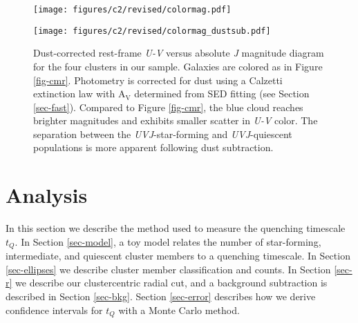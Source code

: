 \begin{figure*}[h!]
\centering \texttt{[image: figures/c2/revised/colormag.pdf]}
\caption[Color-magnitude diagram for the high-redshift SpARCS cluster sample]{Rest-frame \textit{U}-\textit{V} versus absolute \textit{J} magnitude diagram for all photometric-redshift-selected cluster members of the four clusters in the sample (see Table \ref{tbl-clusters}).
The inset panels show rest-frame \textit{U-V} versus \textit{V-J} color-color diagrams, and galaxies are colored red (quiescent) or blue (star-forming) according to their \textit{U-V} and \textit{V-J} colors (see Section \ref{sec-UVJ}).
The mass completeness of our sample corresponds roughly to a magnitude limit of $M_J \lesssim -23$.
\label{fig-cmr}}
\texttt{[image: figures/c2/revised/colormag\_dustsub.pdf]}
\caption[Dust-corrected color-magnitude diagram for the high-redshift SpARCS cluster sample]{Dust-corrected rest-frame \textit{U-V} versus absolute \textit{J} magnitude diagram for the four clusters in our sample.
Galaxies are colored as in Figure \ref{fig-cmr}.
Photometry is corrected for dust using a Calzetti \citep{Calzetti:2001hh} extinction law with A$_\mathrm{V}$ determined from SED fitting (see Section \ref{sec-fast}).
Compared to Figure \ref{fig-cmr}, the blue cloud reaches brighter magnitudes and exhibits smaller scatter in \textit{U-V} color.
The separation between the \textit{UVJ}-star-forming and \textit{UVJ}-quiescent populations is more apparent following dust subtraction.
\label{fig-cmr-dustsub}}
\end{figure*}

\section{Analysis}\label{sec-analysis}

In this section we describe the method used to measure the quenching timescale $t_Q$.
In Section \ref{sec-model}, a toy model relates the number of star-forming, intermediate, and quiescent cluster members to a quenching timescale.
In Section \ref{sec-ellipses} we describe cluster member classification and counts.
In Section \ref{sec-r} we describe our clustercentric radial cut, and a background subtraction is described in Section \ref{sec-bkg}.
Section \ref{sec-error} describes how we derive confidence intervals for $t_Q$ with a Monte Carlo method.

